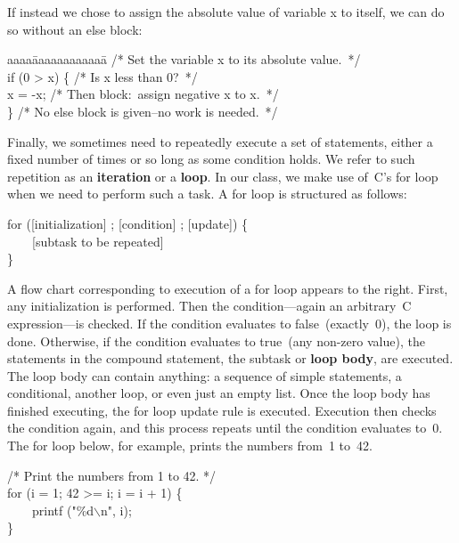 If instead we chose to assign the absolute value of variable {\tfix x}
to itself, we can do so without an {\tfix else} block:
%
{\fix
\begin{tabbing}
aaaa\=aaaaaaaaaaaa\=\kill
/* Set the variable x to its absolute value.~*/\\
if (0 > x) \{\> \>/* Is x less than 0?~*/\\
\> x = -x;    \>/* Then block:~assign negative x to x.~*/\\
\}            \>\> /* No else block is given--no work is needed.~*/
\end{tabbing}
}

\begin{minipage}{4.9in}
Finally, we sometimes need to repeatedly execute a set of statements,
either a fixed number of times or so long as some condition holds.
We refer to such repetition as an {\bf iteration} or a {\bf loop}.
In our class, we make use of~C's {\tfix for} loop when we need to
perform such a task.  A {\tfix for} loop is structured as follows:

{\fix 
\begin{tabbing}
for ([initialization] ; [condition] ; [update]) \{\\
~~~~[subtask to be repeated]\\
\}
\end{tabbing}
}

A flow chart corresponding to execution of a {\tfix for} loop appears
to the right.  First, any initialization is performed.  Then the
condition---again an arbitrary~C expression---is checked.  If the
condition evaluates to false~(exactly~0), the loop is done.  Otherwise,
if the condition evaluates to true~(any non-zero value),
the statements in the compound statement, the subtask or {\bf loop body},
are executed.  The loop body can contain anything: a sequence of simple 
statements, a conditional, another loop, or even just an empty list.
Once the loop body has finished executing, the {\tfix for} loop
update rule is executed.  Execution then checks the condition again,
and this process repeats until the condition evaluates to~0.
The {\tfix for} loop below, for example, prints the numbers 
from~1 to~42.

{\fix 
\begin{tabbing}
/* Print the numbers from 1 to 42. */\\
for (i = 1; 42 >= i; i = i + 1) \{\\
~~~~printf ("\%d$\backslash$n", i);\\
\}\\
\end{tabbing}
}
\end{minipage}\hspace{0.25in}%
\begin{minipage}{1.35in}
\end{minipage}


